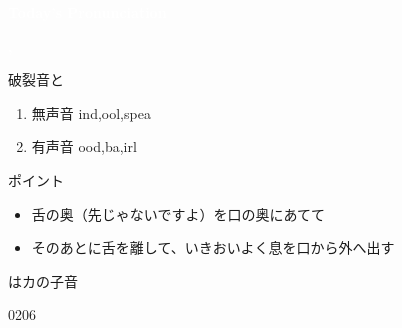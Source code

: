 \documentclass[aspectratio=169,xcolor={dvipsnames,table}]{beamer}
\begin{document}
\begin{frame}
\centering
  \textcolor{white}{\Huge\bfseries Today's Pronunciation}

 \vspace{30pt}

  \textcolor{white}{\Huge\bfseries {}, }

\end{frame}
\begin{frame}[plain,label=slide_k_g]{破裂音と}

\large

\begin{enumerate}
 \item  無声音 \hspace{20pt}ind,\hspace{1\zw}ool,\hspace{1\zw}spea
 \item  有声音 \hspace{20pt}ood,\hspace{1\zw}ba,\hspace{1\zw}irl
\end{enumerate}

\vspace*{20pt}

\normalsize
ポイント

\begin{itemize}[circle]
 \item 舌の奥（先じゃないですよ）を口の奥にあてて
 \item そのあとに舌を離して、いきおいよく息を口から外へ出す
\end{itemize}

 はカの子音

\hfill{\tiny 0206}\,{\scriptsize {}}
\end{frame}
\end{document}

